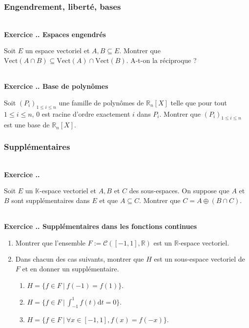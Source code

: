 \documentclass{article}
\newcommand{\di}{\mathrm{d}}
\newcommand{\mb}[1]{\mathbb{#1}}
\newcommand{\mc}[1]{\mathcal{#1}}
\newcounter{exo}
\newcommand{\exercice}[1][\null]{\textbf{\\ Exercice \thesection.\theexo. #1} \addtocounter{exo}{1}}
\begin{document}
\subsubsection{Engendrement, liberté, bases}

\exercice[Espaces engendrés]

Soit $E$ un espace vectoriel et $A,B \subseteq E$. Montrer que $\text{Vect}(A \cap B) \subseteq \text{Vect}(A) \cap \text{Vect}(B)$. A-t-on la réciproque ?


\exercice[Base de polynômes]

Soit $(P_i)_{1 \le i \le n}$ une famille de polynômes de $\mb{R}_n[X]$ telle que pour tout $1 \le i \le n$, $0$ est racine d'ordre exactement $i$ dans $P_i$. Montrer que $(P_i)_{1 \le i \le n}$ est une base de $\mb{R}_n[X]$.


\subsubsection{Supplémentaires}


\exercice

Soit $E$ un $\mb{K}$-espace vectoriel et $A,B$ et $C$ des sous-espaces. On suppose que $A$ et $B$ sont supplémentaires dans $E$ et que $A \subseteq C$. Montrer que $C = A \oplus (B \cap C)$.





\exercice[Supplémentaires dans les fonctions continues]

\begin{enumerate}

\item Montrer que l'ensemble $F := \mc{C}([-1,1], \mb{R})$ est un $\mb{R}$-espace vectoriel.

\item Dans chacun des cas suivants, montrer que $H$ est un sous-espace vectoriel de $F$ et en donner un supplémentaire.

\begin{enumerate}

\item $H = \{f \in F~|~f(-1) = f(1)\}$.

\item $H = \{ f \in F~|~\int_{-1}^1 f(t) \di t = 0\}$.

\item $H = \{ f \in F~|~\forall x \in [-1,1], f(x) = f(-x)\}$.


\end{enumerate}


\end{enumerate}
\end{document}
